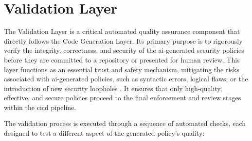
\section{Validation Layer}
\label{sec:validation-layer}

The Validation Layer is a critical automated quality assurance component that directly follows the Code Generation Layer. Its primary purpose is to rigorously verify the integrity, correctness, and security of the \gls{ai}-generated security policies before they are committed to a repository or presented for human review. This layer functions as an essential trust and safety mechanism, mitigating the risks associated with \gls{ai}-generated policies, such as syntactic errors, logical flaws, or the introduction of new security loopholes . It ensures that only high-quality, effective, and secure policies proceed to the final enforcement and review stages within the \gls{cicd} pipeline.

The validation process is executed through a sequence of automated checks, each designed to test a different aspect of the generated policy's quality:

